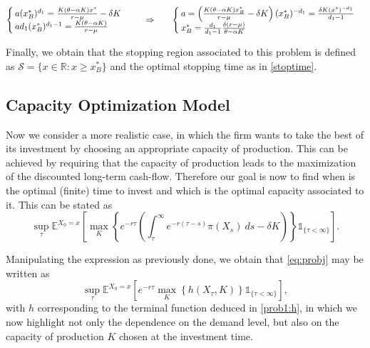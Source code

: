 \begin{equation}
\begin{cases} a(x_B^*)^{d_1}=\frac{K(\theta-\alpha K) x^*}{r-\mu} - \delta K \\
ad_1(x_B^*)^{d_1-1}=\frac{K(\theta-\alpha K)}{r-\mu}
\end{cases}
\hspace{5mm} \Rightarrow \ \hspace{5mm}
\begin{cases}
a= \left( \frac{K(\theta-\alpha K) x_B^*}{r-\mu} - \delta K \right)(x_B^*)^{-d_1} = \frac{\delta K (x^*)^{-d_1}}{d_1-1}\\
x_B^*=\frac{d_1}{d_1-1} \frac{ \delta (r-\mu)}{\theta-\alpha K}
\end{cases}
\label{eq:sistema}
\end{equation}


Finally, we obtain that the stopping region associated to this problem is defined as $\mathcal{S}=\{x\in \mathds{R}:x \geq x_B^* \}$ and the optimal stopping time as in \eqref{stoptime}.



\subsection{Capacity Optimization Model}
\label{subsec:1_com}

Now we consider a more realistic case, in which the firm wants to take the best of its investment by choosing an appropriate capacity of production. This can be achieved by requiring that the capacity of production leads to the maximization of the discounted long-term cash-flow. Therefore our goal is now to find when is the optimal (finite) time to invest and which is the optimal capacity associated to it. This can be stated as
\begin{equation}
\sup_\tau \mathds{E}^{X_0=x} \left[ \max_K \left\{ e^{-r\tau }  \left( \int_\tau^\infty e^{-r(\tau-s)} \pi(X_s)\ ds -\delta K \right) \right\} \mathds{1}_{\{\tau<\infty\}} \right].
\label{eq:probj}
\end{equation}

Manipulating the expression as previously done, we obtain that \eqref{eq:probj} may be written as
\begin{equation}
\sup_\tau \mathds{E}^{X_0=x} \left[ e^{-r\tau } \max_K \left\{ h(X_\tau,K) \right\} \mathds{1}_{\{\tau<\infty\}} \right],
\label{eq:q1}
\end{equation}
with $h$ corresponding to the terminal function deduced in \eqref{prob1:h}, in which we now highlight not only the dependence on the demand level, but also on the capacity of production $K$ chosen at the investment time.

